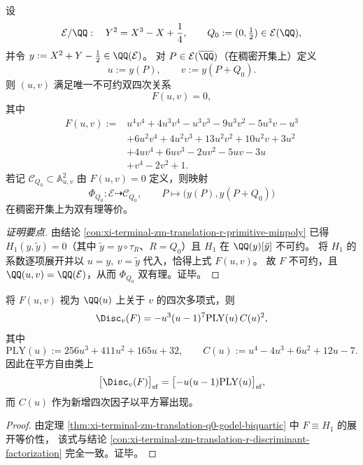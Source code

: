 \begin{theorem}[平移点 \texorpdfstring{$Q_0=(0,\tfrac12)$}{Q0=(0,1/2)} 的双四次外置模型]\label{thm:xi-terminal-zm-translation-q0-godel-biquartic}
设
\[
\mathcal E/\QQ:\quad Y^2=X^3-X+\frac14,\qquad Q_0:=(0,\tfrac12)\in \mathcal E(\QQ),
\]
并令 \(y:=X^2+Y-\tfrac12\in\QQ(\mathcal E)\)。
对 \(P\in\mathcal E(\overline{\QQ})\)（在稠密开集上）定义
\[
u:=y(P),\qquad v:=y(P+Q_0).
\]
则 \((u,v)\) 满足唯一不可约双四次关系
\[
F(u,v)=0,
\]
其中
\[
\begin{aligned}
F(u,v):={}&u^4v^4+4u^3v^4-u^3v^3-9u^3v^2-5u^3v-u^3\\
&+6u^2v^4+4u^2v^3+13u^2v^2+10u^2v+3u^2\\
&+4uv^4+6uv^3-2uv^2-5uv-3u\\
&+v^4-2v^2+1.
\end{aligned}
\]
若记 \(\mathcal C_{Q_0}\subset\mathbb A^2_{u,v}\) 由 \(F(u,v)=0\) 定义，则映射
\[
\Phi_{Q_0}:\mathcal E\dashrightarrow \mathcal C_{Q_0},\qquad
P\longmapsto \bigl(y(P),y(P+Q_0)\bigr)
\]
在稠密开集上为双有理等价。
\end{theorem}
\begin{proof}[证明要点]
由结论 \ref{con:xi-terminal-zm-translation-r-primitive-minpoly} 已得
\(H_1(y,\tilde y)=0\)（其中 \(\tilde y=y\circ\tau_R\)、\(R=Q_0\)）且 \(H_1\) 在 \(\QQ(y)[\tilde y]\) 不可约。
将 \(H_1\) 的系数逐项展开并以 \(u=y,\ v=\tilde y\) 代入，恰得上式 \(F(u,v)\)。
故 \(F\) 不可约，且 \(\QQ(u,v)=\QQ(\mathcal E)\)，从而 \(\Phi_{Q_0}\) 双有理。证毕。
\end{proof}

\begin{corollary}[判别式分解与新增四次分歧因子]\label{cor:xi-terminal-zm-translation-q0-discriminant-new-quartic}
将 \(F(u,v)\) 视为 \(\QQ(u)\) 上关于 \(v\) 的四次多项式，则
\[
\Disc_{v}(F)
=-u^3(u-1)^7\mathrm{PLY}(u)\,C(u)^2,
\]
其中
\[
\mathrm{PLY}(u):=256u^3+411u^2+165u+32,\qquad
C(u):=u^4-4u^3+6u^2+12u-7.
\]
因此在平方自由类上
\[
\bigl[\Disc_v(F)\bigr]_{\mathrm{sf}}
=\bigl[-u(u-1)\mathrm{PLY}(u)\bigr]_{\mathrm{sf}},
\]
而 \(C(u)\) 作为新增四次因子以平方幂出现。
\end{corollary}
\begin{proof}
由定理 \ref{thm:xi-terminal-zm-translation-q0-godel-biquartic} 中 \(F\equiv H_1\) 的展开等价性，
该式与结论 \ref{con:xi-terminal-zm-translation-r-discriminant-factorization} 完全一致。证毕。
\end{proof}

